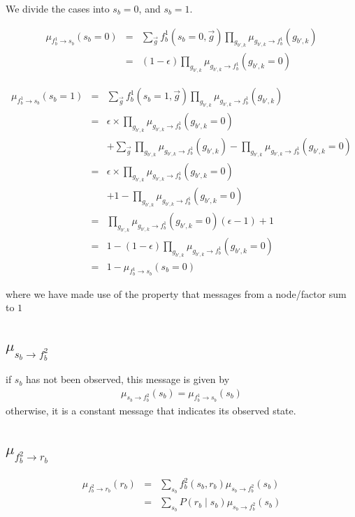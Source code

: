 \documentclass[11pt]{article}
\newcommand{\fb}[1]{f_b^{#1}}
\newcommand{\mSbFb}[1]{\mu_{s_{b} \rightarrow \fb{#1}}}
\newcommand{\mFbSb}[1]{\mu_{ \fb{#1} \rightarrow s_{b}}}
\newcommand{\mFbRb}[1]{\mu_{ \fb{#1} \rightarrow r_{b}}}
\begin{document}
We divide the cases into  $s_b=0$, and  $s_b=1$.

\begin{eqnarray}
\mFbSb1(s_b=0) &=& \sum_{\vec{g}} \fb1(s_b=0, \vec{g}) \prod_{g_{b',k}} \mu_{g_{b',k} \rightarrow \fb1}(g_{b',k}) \\
&=&  (1-\epsilon) \prod_{g_{b',k}} \mu_{g_{b',k} \rightarrow \fb1}(g_{b',k}=0)
\end{eqnarray}

\begin{eqnarray}
\mFbSb1(s_b=1) &=& \sum_{\vec{g}} \fb1(s_b=1, \vec{g}) \prod_{g_{b',k}} \mu_{g_{b',k} \rightarrow \fb1}(g_{b',k}) \\
&=&  \epsilon \times \prod_{g_{b',k}} \mu_{g_{b',k} \rightarrow \fb1}(g_{b',k}=0)  \\
& & + \sum_{\vec{g}}  \prod_{g_{b',k}} \mu_{g_{b',k} \rightarrow \fb1}(g_{b',k}) - \prod_{g_{b',k}} \mu_{g_{b',k} \rightarrow \fb1}(g_{b',k}=0) \nonumber \\
&=& \epsilon \times \prod_{g_{b',k}} \mu_{g_{b',k} \rightarrow \fb1}(g_{b',k}=0)  \\
& & +1 - \prod_{g_{b',k}}  \mu_{g_{b',k} \rightarrow \fb1}(g_{b',k}=0) \nonumber \\
&=&  \prod_{g_{b',k}} \mu_{g_{b',k} \rightarrow \fb1}(g_{b',k}=0) (\epsilon -1 ) +1 \\
&=&  1- (1-\epsilon) \prod_{g_{b',k}} \mu_{g_{b',k} \rightarrow \fb1}(g_{b',k}=0) \\
&=&  1- \mFbSb1(s_b=0)
\end{eqnarray}

where we have made use of the property that messages from a node/factor sum to $1$

\subsection{$\mSbFb2$}

if $s_b$ has not been observed, this message is given by
\begin{eqnarray}
\mSbFb2(s_b) = \mFbSb1(s_b)
\end{eqnarray}
otherwise, it is a constant message that indicates its observed state.

\subsection{ $\mFbRb2$}

\begin{eqnarray}
\mFbRb2(r_b) &=& \sum_{s_b} \fb2(s_b,r_b) \mSbFb2(s_b) \\
&=& \sum_{s_b} P(r_b \mid s_b)  \mSbFb2(s_b)
\end{eqnarray}
\end{document}
